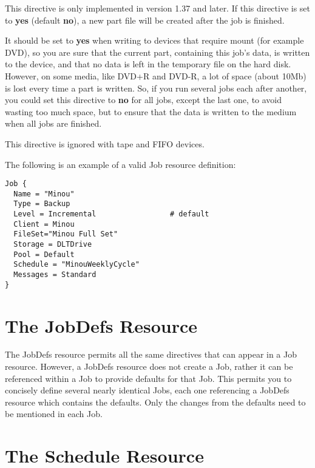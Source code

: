 \begin{description}
\label{WritePartAfterJob}
\item [Write Part After Job = \lt{}yes\vb{}no\gt{}]
   This directive is only implemented in version 1.37 and later.
   If this directive is set to {\bf yes} (default {\bf no}), a new part file
   will be created after the job is finished.  

   It should be set to {\bf yes} when writing to devices that require mount
   (for example DVD), so you are sure that the current part, containing
   this job's data, is written to the device, and that no data is left in
   the temporary file on the hard disk.  However, on some media, like DVD+R
   and DVD-R, a lot of space (about 10Mb) is lost every time a part is
   written.  So, if you run several jobs each after another, you could set
   this directive to {\bf no} for all jobs, except the last one, to avoid
   wasting too much space, but to ensure that the data is written to the
   medium when all jobs are finished.

   This directive is ignored with tape and FIFO devices.  

\end{description}

The following is an example of a valid Job resource definition: 

\footnotesize
\begin{verbatim}
Job {
  Name = "Minou"
  Type = Backup
  Level = Incremental                 # default
  Client = Minou
  FileSet="Minou Full Set"
  Storage = DLTDrive
  Pool = Default
  Schedule = "MinouWeeklyCycle"
  Messages = Standard
}
\end{verbatim}
\normalsize

\section{The JobDefs Resource}
\label{JobDefsResource}

The JobDefs resource permits all the same directives that can appear in a Job
resource. However, a JobDefs resource does not create a Job, rather it can be
referenced within a Job to provide defaults for that Job. This permits you to
concisely define several nearly identical Jobs, each one referencing a JobDefs
resource which contains the defaults. Only the changes from the defaults need to
be mentioned in each Job. 

\section{The Schedule Resource}
\label{ScheduleResource}

